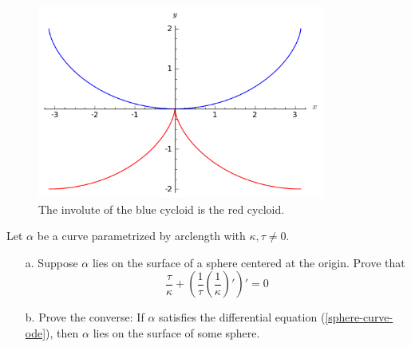 \documentclass[Shifrin_Solutions_Spring_2015]{subfiles}
\begin{document}
\begin{figure}[h]
\centering
\includegraphics[height=2.5in]{picturebook/ch1sec2/ex1-2-17}
\caption{The involute of the blue cycloid is the red cycloid.}
\end{figure}





\begin{exercise}
Let $\alpha$ be a curve parametrized by arclength with $\kappa,\tau \neq 0$.
\begin{itemize}
\item[a.] Suppose $\alpha$ lies on the surface of a sphere centered at the origin. Prove that
\begin{equation}\label{sphere-curve-ode}
\dfrac{\tau}{\kappa} + \left(\dfrac{1}{\tau} \left(\dfrac{1}{\kappa}\right)' \right)' =0
\end{equation}

\item[b.] Prove the converse: If $\alpha$ satisfies the differential equation (\ref{sphere-curve-ode}), then $\alpha$ lies on the surface of some sphere.
\end{itemize}
\end{exercise}
\end{document}
